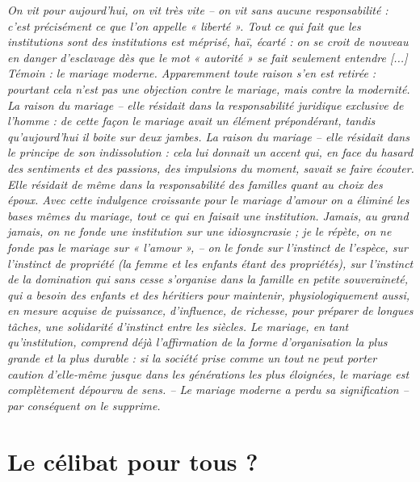 \begin{displayquote}
%
\emph{On vit pour aujourd'hui, on vit très vite -- on vit sans aucune responsabilité : c'est précisément ce que l'on appelle « liberté ». Tout ce qui fait que les institutions sont des institutions est méprisé, haï, écarté : on se croit de nouveau en danger d'esclavage dès que le mot « autorité » se fait seulement entendre \emph{[...]} Témoin : \emph{le mariage moderne}. Apparemment toute raison s'en est retirée : pourtant cela n'est pas une objection contre le mariage, mais contre la modernité. La raison du mariage -- elle résidait dans la responsabilité juridique exclusive de l'homme : de cette façon le mariage avait un élément prépondérant, tandis qu'aujourd'hui il boite sur deux jambes. La raison du mariage -- elle résidait dans le principe de son indissolution : cela lui donnait un accent qui, en face du hasard des sentiments et des passions, des impulsions du moment, \emph{savait se faire écouter}. Elle résidait de même dans la responsabilité des familles quant au choix des époux. Avec cette indulgence croissante pour le mariage \emph{d'amour} on a éliminé les bases mêmes du mariage, tout ce qui en faisait une institution. Jamais, au grand jamais, on ne fonde une institution sur une idiosyncrasie ; je le répète, on ne fonde pas le mariage sur « l'amour », -- on le fonde sur l'instinct de l'espèce, sur l'instinct de propriété (la femme et les enfants étant des propriétés), sur \emph{l'instinct de la domination} qui sans cesse s'organise dans la famille en petite souveraineté, qui a \emph{besoin} des enfants et des héritiers pour maintenir, physiologiquement aussi, en mesure acquise de puissance, d'influence, de richesse, pour préparer de longues tâches, une solidarité d'instinct entre les siècles. Le mariage, en tant qu'institution, comprend déjà l'affirmation de la forme d'organisation la plus grande et la plus durable : si la société prise comme un tout ne peut \emph{porter caution} d'elle-même jusque dans les générations les plus éloignées, le mariage est complètement dépourvu de sens. -- Le mariage moderne a perdu sa signification -- par conséquent on le supprime.}  
%
\end{displayquote}

 \chapter{Le célibat pour tous ?}
 

